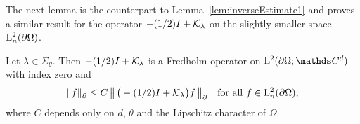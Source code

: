 The next lemma is the counterpart to Lemma~\ref{lem:inverseEstimate1} and proves a similar result for the operator $-(1/2)I + \mathcal{K}_\lambda$ on the slightly smaller space $\mathrm{L}^2_n(\partial\Omega)$.

\begin{lem}
  \label{lem:inverseEstimate}
  Let $\lambda \in \Sigma_\theta$.
  Then $-(1/2)I + \mathcal{K}_\lambda$ is a Fredholm operator on $\Ell^2(\partial\Omega; \C^d)$ with index zero and
  \begin{align}
    \label{eq:inverseEstimate2}
    \| f\|^{}_\partial \leq C \, \big\| \, \big( - (1/2) I + \mathcal{K}_\lambda \big) f\, \big\|^{}_\partial \quad\text{for all } f \in \mathrm{L}^2_n(\partial\Omega),
  \end{align}
  where $C$ depends only on $d$, $\theta$ and the Lipschitz character of $\Omega$.
\end{lem}

